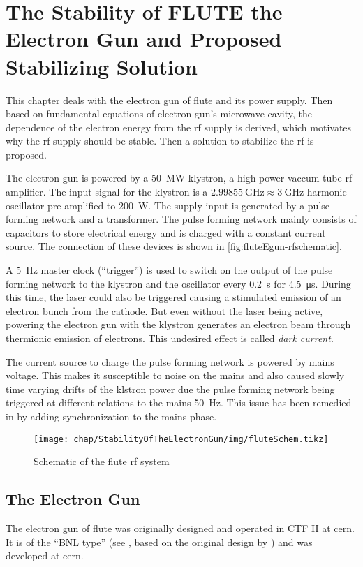 \chapter{The Stability of FLUTE the Electron Gun and Proposed Stabilizing Solution}
This chapter deals with the electron gun of \gls{flute} and its power supply. Then based on fundamental equations of electron gun's microwave cavity, the dependence of the electron energy from the \gls{rf} supply is derived, which motivates why the \gls{rf} supply should be stable. Then a solution to stabilize the \gls{rf} is proposed.

The electron gun is powered by a \SI{50}{\MW} klystron, a high-power vaccum tube \gls{rf} amplifier. The input signal for the klystron is a $\SI{2.99855}{\GHz}\approx\SI{3}{\GHz}$ harmonic oscillator pre-amplified to \SI{200}{\watt}. The supply input is generated by a pulse forming network and a transformer. The pulse forming network mainly consists of capacitors to store electrical energy and is charged with a constant current source. The connection of these devices is shown in \autoref{fig:fluteEgun-rfschematic}.

A \SI{5}{\hertz} master clock (``trigger'') is used to switch on the output of the pulse forming network to the klystron and the oscillator every \SI{0.2}{\second} for \SI{4.5}{\micro\second}. During this time, the laser could also be triggered causing a stimulated emission of an electron bunch from the cathode. But even without the laser being active, powering the electron gun with the klystron generates an electron beam through thermionic emission of electrons. This undesired effect is called \textit{dark current}.

The current source to charge the pulse forming network is powered by mains voltage. This makes it susceptible to noise on the mains and also caused slowly time varying drifts of the klstron power due the pulse forming network being triggered at different relations to the mains \SI{50}{\hertz}. This issue has been remedied in \cite{Nasse2019} by adding synchronization to the mains phase.

\begin{figure}[tbh]
	\centering
	\texttt{[image: chap/StabilityOfTheElectronGun/img/fluteSchem.tikz]}
	\caption[FLUTE RF schematic]{Schematic of the \gls{flute} \gls{rf} system}
	\label{fig:fluteEgun-rfschematic}
\end{figure}

\section{The Electron Gun}
The electron gun of \gls{flute} was originally designed and operated in CTF II at \gls{cern}. \cite{Schuh2014}
It is of the ``BNL type'' (see \cite{Batchelor1988}, based on the original design by \cite{fraser1987}) and was  developed at \gls{cern}. \cite{Bossart:288412}

